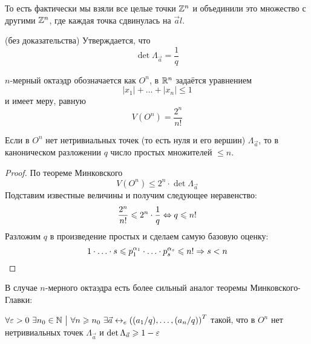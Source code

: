 \begin{note}
	То есть фактически мы взяли все целые точки $\mathbb{Z}^n$ и объединили это множество с другими $\mathbb{Z}^n$, где каждая точка сдвинулась на $\vec{a}l$.
\end{note}

\begin{theorem} (без доказательства)
	Утверждается, что
	\[
		\det \Lambda_{\vec{a}} = \frac{1}{q}
	\]
\end{theorem}

\begin{reminder}
	$n$-мерный октаэдр обозначается как $O^n$, в $\mathbb{R}^n$ задаётся уравнением
	\[
		|x_1| + \ldots + |x_n| \le 1
	\]
	и имеет меру, равную
	\[
		V(O^n) = \frac{2^n}{n!}
	\]
\end{reminder}

\begin{corollary}
	Если в $O^n$ нет нетривиальных точек (то есть нуля и его вершин) $\Lambda_{\vec{a}}$, то в каноническом разложении $q$ число простых множителей $\le n$.
\end{corollary}

\begin{proof}
	По теореме Минковского
	\[
		V(O^n) \le 2^n \cdot \det \Lambda_{\vec{a}}
	\]
	Подставим известные величины и получим следующее неравенство:
	\[
		\frac{2^n}{n!} \leqslant 2^n \cdot \frac{1}{q} \Leftrightarrow q \leqslant n!
	\]
	Разложим $q$ в произведение простых и сделаем самую базовую оценку:
	\[
		1 \cdot \ldots \cdot s \leqslant p_1^{\alpha_1} \cdot \ldots \cdot p_s^{\alpha_s} \leqslant n! \Rightarrow s < n
	\]
\end{proof}

\begin{theorem}
	В случае $n$-мерного октаэдра есть более сильный аналог теоремы Минковского-Главки:
	
	\(
		\forall \varepsilon > 0\ \exists n_0 \in \mathbb{N} \ \big|\  \forall n \geqslant n_0\ \exists \vec{a} \leftrightarrow_e \left((a_1/q), \ldots, (a_n/q)\right)^T
	\) такой, что в $O^n$ нет нетривиальных точек $\Lambda_{\vec{a}}$ и $\det \Lambda_{\vec{a}} \geqslant 1 - \varepsilon$
\end{theorem}